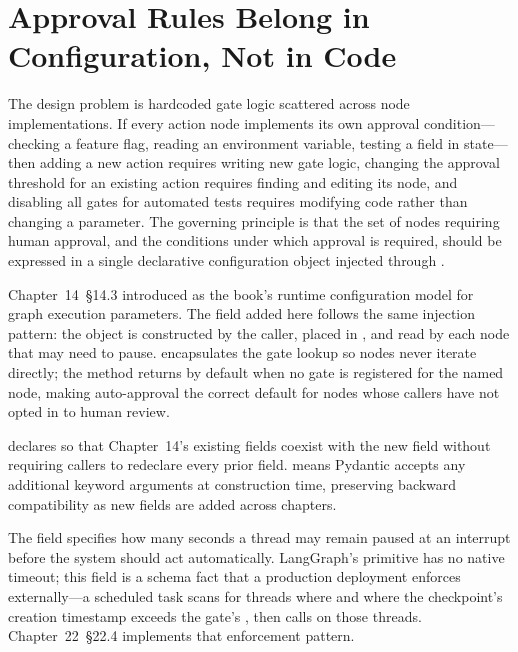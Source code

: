 \section{Approval Rules Belong in Configuration, Not in Code}
\label{sec:hitl-policy}

The design problem is hardcoded gate logic scattered across node
implementations. If every action node implements its own approval
condition---checking a feature flag, reading an environment variable,
testing a field in state---then adding a new action requires writing new
gate logic, changing the approval threshold for an existing action requires
finding and editing its node, and disabling all gates for automated tests
requires modifying code rather than changing a parameter. The governing
principle is that the set of nodes requiring human approval, and the
conditions under which approval is required, should be expressed in a
single declarative configuration object injected through
.

Chapter~14~\S14.3 introduced  as the book's runtime
configuration model for graph execution parameters. The 
field added here follows the same injection pattern: the object is
constructed by the caller, placed in
, and read by each node
that may need to pause.  encapsulates
the gate lookup so nodes never iterate  directly; the
method returns  by default when no gate is registered for the
named node, making auto-approval the correct default for nodes whose
callers have not opted in to human review.

\begin{notebox}
 declares
 so that Chapter~14's
existing fields coexist with the new  field without
requiring callers to redeclare every prior field.  means
Pydantic accepts any additional keyword arguments at construction time,
preserving backward compatibility as new fields are added across chapters.
\end{notebox}

The  field specifies how many seconds
a thread may remain paused at an interrupt before the system should act
automatically. LangGraph's  primitive has no native
timeout; this field is a schema fact that a production deployment enforces
externally---a scheduled task scans for threads where
 and where the checkpoint's creation timestamp
exceeds the gate's , then calls
 on those threads.
Chapter~22~\S22.4 implements that enforcement pattern.

